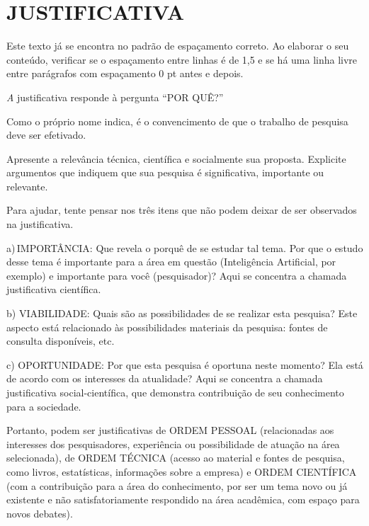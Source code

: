 \section{JUSTIFICATIVA}

Este texto já se encontra no padrão de espaçamento correto. Ao elaborar o seu conteúdo, verificar se o espaçamento entre linhas é de 1,5 e se há uma linha livre entre parágrafos com espaçamento 0 pt antes e depois. 
\cite{manual}

\textit
A justificativa responde à pergunta “POR QUÊ?” 

Como o próprio nome indica, é o convencimento de que o trabalho de pesquisa deve ser efetivado.  

Apresente a relevância técnica, científica e socialmente sua proposta. Explicite argumentos que indiquem que sua pesquisa é significativa, importante ou relevante.  

Para ajudar, tente pensar nos três itens que não podem deixar de ser observados na justificativa. 

a) IMPORTÂNCIA: Que revela o porquê de se estudar tal tema. Por que o estudo desse tema é importante para a área em questão (Inteligência Artificial, por exemplo) e importante para você (pesquisador)? Aqui se concentra a chamada justificativa científica.  

b) VIABILIDADE: Quais são as possibilidades de se realizar esta pesquisa? Este aspecto está relacionado às possibilidades materiais da pesquisa: fontes de consulta disponíveis, etc. 

c) OPORTUNIDADE: Por que esta pesquisa é oportuna neste momento? Ela está de acordo com os interesses da atualidade? Aqui se concentra a chamada justificativa social-científica, que demonstra contribuição de seu conhecimento para a sociedade. 

Portanto, podem ser justificativas de ORDEM PESSOAL (relacionadas aos interesses dos pesquisadores, experiência ou possibilidade de atuação na área selecionada), de ORDEM TÉCNICA (acesso ao material e fontes de pesquisa, como livros, estatísticas, informações sobre a empresa) e ORDEM CIENTÍFICA (com a contribuição para a área do conhecimento, por ser um tema novo ou já existente e não satisfatoriamente respondido na área acadêmica, com espaço para novos debates). 
